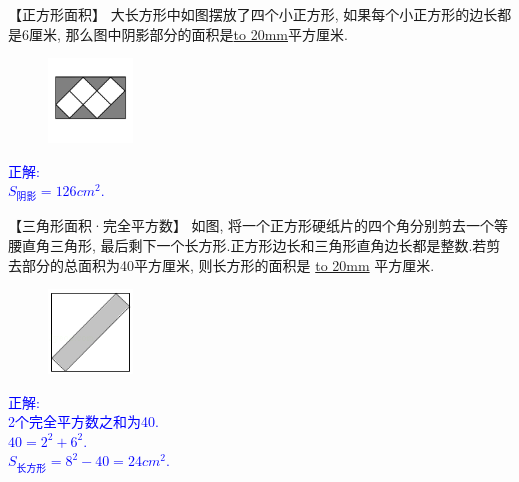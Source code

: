\item {
    【正方形面积】
    大长方形中如图摆放了四个小正方形, 如果每个小正方形的边长都是6厘米, 那么图中阴影部分的面积是\underline{\hbox to 20mm{}}平方厘米.
    \begin{figure}[H] 
        \centering
        \includegraphics[width=0.2\textwidth]{./pics/Chapter_2/19.png}
    \end{figure}
    \ifshowSolution 
        \fangsong{}\textcolor{blue}{
            正解: \\
            $S_{阴影} = 126 {cm}^2$.
        }
    \else
        \vspace{1cm}
    \fi
}

\item {
    【三角形面积·完全平方数】
    如图, 将一个正方形硬纸片的四个角分别剪去一个等腰直角三角形, 最后剩下一个长方形.正方形边长和三角形直角边长都是整数.若剪去部分的总面积为40平方厘米, 则长方形的面积是 \underline{\hbox to 20mm{}} 平方厘米.
    \begin{figure}[H] 
        \centering
        \includegraphics[width=0.2\textwidth]{./pics/Chapter_2/12.png}
    \end{figure}
    \ifshowSolution 
        \fangsong{}\textcolor{blue}{
            正解: \\
            2个完全平方数之和为40.\\
            $40 = 2^2 + 6^2$.\\
            $S_{长方形} = 8^2 - 40 = 24 {cm}^2$.
        }
    \else
        \vspace{1cm}
    \fi
}

